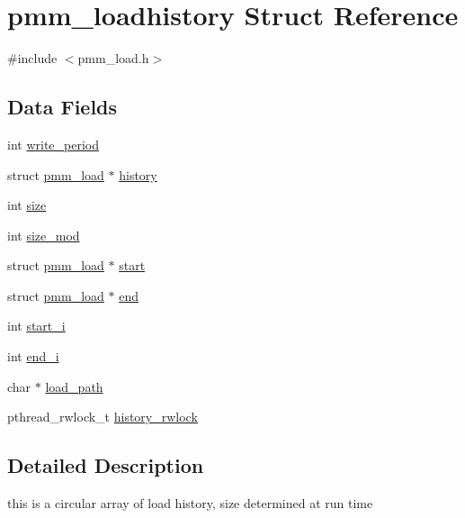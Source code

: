 \hypertarget{structpmm__loadhistory}{\section{pmm\-\_\-loadhistory Struct Reference}
\label{structpmm__loadhistory}
}


{\ttfamily \#include $<$pmm\-\_\-load.\-h$>$}

\subsection*{Data Fields}
\begin{DoxyCompactItemize}
\item 
int \hyperlink{structpmm__loadhistory_ab7ecf5a0323e3b846f120cd6ef3c7bc2}{write\-\_\-period}
\item 
struct \hyperlink{structpmm__load}{pmm\-\_\-load} $\ast$ \hyperlink{structpmm__loadhistory_ac1a03c7b76da5e55fa51faab0b4a1adf}{history}
\item 
int \hyperlink{structpmm__loadhistory_aa94cad9b8b853fcd64e5f5ac5dd7add1}{size}
\item 
int \hyperlink{structpmm__loadhistory_ab4ba4ac36c795a0e44613fb705717d6d}{size\-\_\-mod}
\item 
struct \hyperlink{structpmm__load}{pmm\-\_\-load} $\ast$ \hyperlink{structpmm__loadhistory_ab707ce6e315991228742ea379694d888}{start}
\item 
struct \hyperlink{structpmm__load}{pmm\-\_\-load} $\ast$ \hyperlink{structpmm__loadhistory_a5e799b7ad1c650bd965a2f672b730e78}{end}
\item 
int \hyperlink{structpmm__loadhistory_ab9e44fcb5987f5a6a891da336c43d213}{start\-\_\-i}
\item 
int \hyperlink{structpmm__loadhistory_a5625aa601ce71467ddc8f4720db32a73}{end\-\_\-i}
\item 
char $\ast$ \hyperlink{structpmm__loadhistory_a8e8ae65131890372da0bbeff437fad31}{load\-\_\-path}
\item 
pthread\-\_\-rwlock\-\_\-t \hyperlink{structpmm__loadhistory_ae0fbcd6252ab6a1ab49be6f891271ccb}{history\-\_\-rwlock}
\end{DoxyCompactItemize}


\subsection{Detailed Description}
this is a circular array of load history, size determined at run time 

